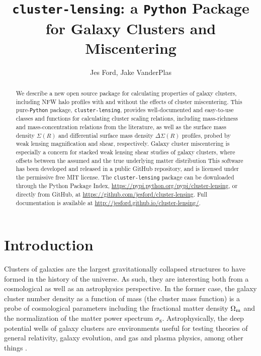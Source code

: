 \documentclass{emulateapj}
\newcommand{\code}{\lstinline[style=codeintext]}
\newcommand{\hcode}{\large\normalfont\texttt} %
\begin{document}
\title{\MakeLowercase{\hcode{cluster-lensing}}: a \hcode{P}\MakeLowercase{\hcode{ython}} Package for Galaxy Clusters and Miscentering}

\author{
Jes Ford,
Jake VanderPlas
}

\shorttitle{\hcode{cluster-lensing}}


\begin{abstract}
We describe a new open source package for calculating properties of galaxy clusters, including NFW halo profiles with and without the effects of cluster miscentering. This pure-\code{Python} package, \code{cluster-lensing}, provides well-documented and easy-to-use classes and functions for calculating cluster scaling relations, including mass-richness and mass-concentration relations from the literature, as well as the surface mass density $\Sigma(R)$ and differential surface mass density $\Delta\Sigma(R)$ profiles, probed by weak lensing magnification and shear, respectively. Galaxy cluster miscentering is especially a concern for stacked weak lensing shear studies of galaxy clusters, where offsets between the assumed and the true underlying matter distribution
This software has been developed and released in a public GitHub repository, and is licensed under the permissive free MIT license. The \code{cluster-lensing} package can be downloaded through the Python Package Index, \url{https://pypi.python.org/pypi/cluster-lensing}, or directly from GitHub, at \url{https://github.com/jesford/cluster-lensing}. Full documentation is available at \url{http://jesford.github.io/cluster-lensing/}.
\end{abstract}


\setcounter{section}{0}
\setcounter{subsection}{0}
\setcounter{subsubsection}{0}


\section{Introduction}
\label{intro}

Clusters of galaxies are the largest gravitationally collapsed structures to have formed in the history of the universe.  As such, they are interesting both from a cosmological as well as an astrophysics perspective. In the former case, the galaxy cluster number density as a function of mass (the cluster mass function) is a probe of cosmological parameters including the fractional matter density $\Omega_{\rm m}$ and the normalization of the matter power spectrum $\sigma_8$. Astrophysically, the deep potential wells of galaxy clusters are environments useful for testing theories of general relativity, galaxy evolution, and gas and plasma physics, among other things \citep{Voit05}. 
\end{document}

